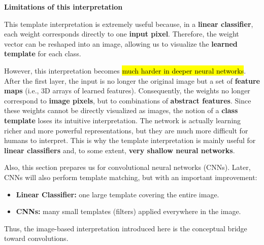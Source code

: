 \highspace
\begin{flushleft}
    \textcolor{Red2}{ \textbf{Limitations of this interpretation}}
\end{flushleft}
This template interpretation is extremely useful because, in a \textbf{linear classifier}, each weight corresponds directly to one \textbf{input pixel}. Therefore, the weight vector can be reshaped into an image, allowing us to visualize the \textbf{learned template} for each class.

\highspace
However, this interpretation becomes \hl{much harder in deeper neural networks}. After the first layer, the input is no longer the original image but a set of \textbf{feature maps} (i.e., 3D arrays of learned features). Consequently, the weights no longer correspond to \textbf{image pixels}, but to combinations of \textbf{abstract features}. Since these weights cannot be directly visualized as images, the notion of a \textbf{class template} loses its intuitive interpretation. The network is actually learning richer and more powerful representations, but they are much more difficult for humans to interpret. This is why the template interpretation is mainly useful for \textbf{linear classifiers} and, to some extent, \textbf{very shallow neural networks}.

\highspace
Also, this section prepares us for convolutional neural networks (CNNs). Later, CNNs will also perform template matching, but with an important improvement:
\begin{itemize}
    \item \textbf{Linear Classifier:} one large template covering the entire image.
    \item \textbf{CNNs:} many small templates (filters) applied everywhere in the image.
\end{itemize}
Thus, the image-based interpretation introduced here is the conceptual bridge toward convolutions.